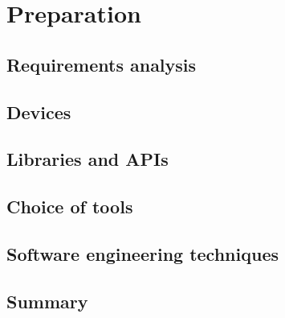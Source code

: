 \chapter{Preparation}
  \section{Requirements analysis}
  \section{Devices}
  \section{Libraries and APIs}
  \section{Choice of tools}
  \section{Software engineering techniques}
  \section{Summary}
